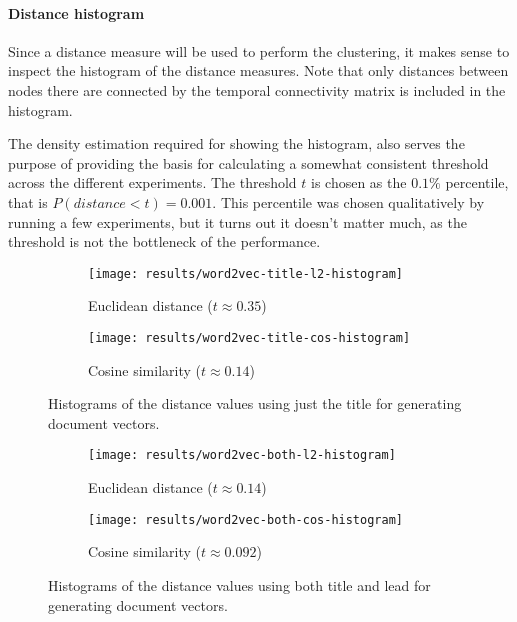 \paragraph{Distance histogram} Since a distance measure will be used to perform the clustering, it makes sense to inspect the histogram of the distance measures. Note that only distances between nodes there are connected by the temporal connectivity matrix is included in the histogram.

The density estimation required for showing the histogram, also serves the purpose of providing the basis for calculating a somewhat consistent threshold across the different experiments. The threshold $t$ is chosen as the $0.1 \%$ percentile, that is $P(distance < t) = 0.001$. This percentile was chosen qualitatively by running a few experiments, but it turns out it doesn't matter much, as the threshold is not the bottleneck of the performance.

\begin{figure}[H]
        \centering
        \begin{subfigure}[b]{0.49\textwidth}
                \texttt{[image: results/word2vec-title-l2-histogram]}
                \caption{Euclidean distance ($t \approx 0.35$)}
        \end{subfigure}
        \begin{subfigure}[b]{0.49\textwidth}
                \texttt{[image: results/word2vec-title-cos-histogram]}
                \caption{Cosine similarity ($t \approx 0.14$)}
        \end{subfigure}
        \caption{Histograms of the distance values using just the title for generating document vectors.}
\end{figure}
\begin{figure}[H]
        \centering
        \begin{subfigure}[b]{0.49\textwidth}
                \texttt{[image: results/word2vec-both-l2-histogram]}
                \caption{Euclidean distance ($t \approx 0.14$)}
        \end{subfigure}
        \begin{subfigure}[b]{0.49\textwidth}
                \texttt{[image: results/word2vec-both-cos-histogram]}
                \caption{Cosine similarity ($t \approx 0.092$)}
        \end{subfigure}
        \caption{Histograms of the distance values using both title and lead for generating document vectors.}
\end{figure}


